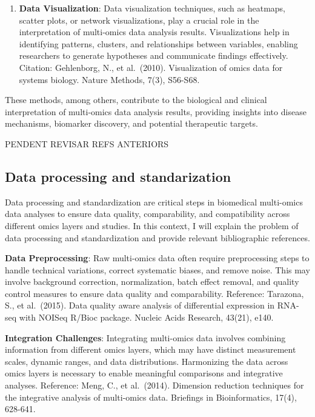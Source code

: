 \documentclass[a4paper, nobind]{templates/ociamthesis}
\begin{document}
\begin{enumerate}
\item
  \textbf{Data Visualization}: Data visualization techniques, such as heatmaps, scatter plots, or network visualizations, play a crucial role in the interpretation of multi-omics data analysis results. Visualizations help in identifying patterns, clusters, and relationships between variables, enabling researchers to generate hypotheses and communicate findings effectively. Citation: Gehlenborg, N., et al.~(2010). Visualization of omics data for systems biology. Nature Methods, 7(3), S56-S68.
\end{enumerate}

These methods, among others, contribute to the biological and clinical interpretation of multi-omics data analysis results, providing insights into disease mechanisms, biomarker discovery, and potential therapeutic targets.

PENDENT REVISAR REFS ANTERIORS

\hypertarget{data-processing-and-standarization}{%
\subsection{Data processing and standarization}\label{data-processing-and-standarization}}

Data processing and standardization are critical steps in biomedical multi-omics data analyses to ensure data quality, comparability, and compatibility across different omics layers and studies. In this context, I will explain the problem of data processing and standardization and provide relevant bibliographic references.

\textbf{Data Preprocessing}: Raw multi-omics data often require preprocessing steps to handle technical variations, correct systematic biases, and remove noise. This may involve background correction, normalization, batch effect removal, and quality control measures to ensure data quality and comparability. Reference: Tarazona, S., et al.~(2015). Data quality aware analysis of differential expression in RNA-seq with NOISeq R/Bioc package. Nucleic Acids Research, 43(21), e140.

\textbf{Integration Challenges}: Integrating multi-omics data involves combining information from different omics layers, which may have distinct measurement scales, dynamic ranges, and data distributions. Harmonizing the data across omics layers is necessary to enable meaningful comparisons and integrative analyses. Reference: Meng, C., et al.~(2014). Dimension reduction techniques for the integrative analysis of multi-omics data. Briefings in Bioinformatics, 17(4), 628-641.
\end{document}
